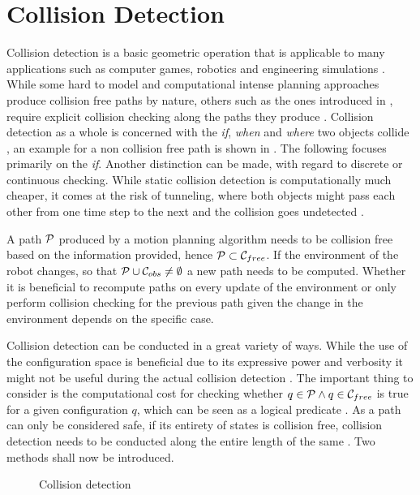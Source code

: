 \chapter{Collision Detection}
Collision detection is a basic geometric operation that is applicable to many applications such as computer games, robotics and engineering simulations \cite{Ericson.2005,Ponamgi.1997,Chazelle.1987}. While some hard to model and computational intense planning approaches produce collision free paths by nature, others such as the ones introduced in , require explicit collision checking along the paths they produce \cite{LaValle.2006}. Collision detection as a whole is concerned with the \emph{if}, \emph{when} and \emph{where} two objects collide \cite{Ericson.2005}, an example for a non collision free path is shown in . The following focuses primarily on the \emph{if}. Another distinction can be made, with regard to discrete or continuous checking. While static collision detection is computationally much cheaper, it comes at the risk of tunneling, where both objects might pass each other from one time step to the next and the collision goes undetected \cite{Ericson.2005}.

A path $\mathcal{P}$ produced by a motion planning algorithm needs to be collision free based on the information provided, hence $\mathcal{P} \subset \mathcal{C}_{free}$. If the environment of the robot changes, so that $\mathcal{P} \cup \mathcal{C}_{obs} \neq \emptyset$ a new path needs to be computed. Whether it is beneficial to recompute paths on every update of the environment or only perform collision checking for the previous path given the change in the environment depends on the specific case.

Collision detection can be conducted in a great variety of ways. While the use of the configuration space is beneficial due to its expressive power and verbosity it might not be useful during the actual collision detection \cite{LaValle.2006}. The important thing to consider is the computational cost for checking whether $q \in \mathcal{P} \land q \in \mathcal{C}_{free}$ is true for a given configuration $q$, which can be seen as a logical predicate \cite{LaValle.2006}. As a path can only be considered safe, if its entirety of states is collision free, collision detection needs to be conducted along the entire length of the same \cite{LaValle.2006,Ericson.2005}. Two methods shall now be introduced.

\begin{figure}[h]
    \caption{Collision detection}
    \label{fig:collisionDetection}
\end{figure}

